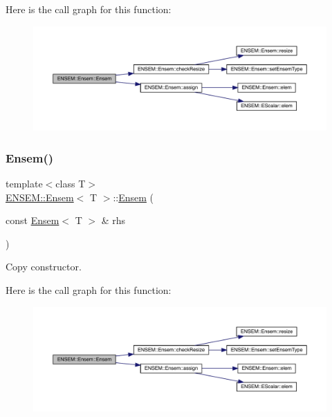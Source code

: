 Here is the call graph for this function\+:
\nopagebreak
\begin{figure}[H]
\begin{center}
\leavevmode
\includegraphics[width=350pt]{d7/d3e/classENSEM_1_1Ensem_ab0e04ebf09af997fb7f1477cdc48145b_cgraph}
\end{center}
\end{figure}
\mbox{\label{classENSEM_1_1Ensem_a5e80cf6ad71f96ba2fa28cac27f06003}} 
\subsubsection{\texorpdfstring{Ensem()}{Ensem()}\hspace{0.1cm}{\footnotesize\ttfamily [6/9]}}
{\footnotesize\ttfamily template$<$class T$>$ \\
\mbox{\hyperlink{classENSEM_1_1Ensem}{E\+N\+S\+E\+M\+::\+Ensem}}$<$ T $>$\+::\mbox{\hyperlink{classENSEM_1_1Ensem}{Ensem}} (\begin{DoxyParamCaption}\item[{const \mbox{\hyperlink{classENSEM_1_1Ensem}{Ensem}}$<$ T $>$ \&}]{rhs }\end{DoxyParamCaption})\hspace{0.3cm}{\ttfamily [inline]}}



Copy constructor. 

Here is the call graph for this function\+:
\nopagebreak
\begin{figure}[H]
\begin{center}
\leavevmode
\includegraphics[width=350pt]{d7/d3e/classENSEM_1_1Ensem_a5e80cf6ad71f96ba2fa28cac27f06003_cgraph}
\end{center}
\end{figure}
\mbox{\label{classENSEM_1_1Ensem_a8875b85c5536f02d10db536a815984b6}} 
